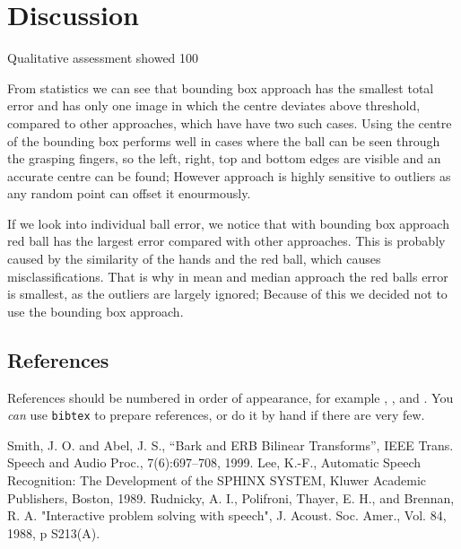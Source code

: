\documentclass[10pt,a4paper,oneclumn]{article}
\begin{document}
\section{Discussion}
Qualitative assessment showed 100%

From statistics we can see that bounding box approach has the smallest total error and has only one image in which the centre deviates above threshold, compared to other approaches, which have have two such cases. Using the centre of the bounding box performs well in cases where the ball can be seen through the grasping fingers, so the left, right, top and bottom edges are visible and an accurate centre can be found; However approach is highly sensitive to outliers as any random point can offset it enourmously.

If we look into individual ball error, we notice that with bounding box approach red ball has the largest error compared with other approaches. This is probably caused by the similarity of the hands and the red ball, which causes misclassifications. That is why in mean and median approach the red balls error is smallest, as the outliers are largely ignored; Because of this we decided not to use the bounding box approach.

\subsection{References}

References should be numbered in order of appearance, 
for example \cite{ES1}, \cite{ES2}, and \cite{ES3}. 
You \emph{can} use \texttt{bibtex} to prepare references,
or do it by hand if there are very few.

%

\begin{thebibliography}{10}
 Smith, J. O. and Abel, J. S., 
``Bark and {ERB} Bilinear Transforms'', 
IEEE Trans. Speech and Audio Proc., 7(6):697--708, 1999.  
 Lee, K.-F., Automatic Speech Recognition: 
The Development of the 
SPHINX SYSTEM, Kluwer Academic Publishers, Boston, 1989.
 Rudnicky, A. I., Polifroni, Thayer, E. H.,
 and Brennan, R. A.  
"Interactive problem solving with speech", J. Acoust. Soc. Amer., 
Vol. 84, 1988, p S213(A).
\end{thebibliography}
\end{document}
